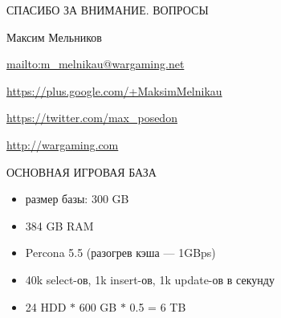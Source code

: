 \documentclass[aspectratio=169]{beamer}
\begin{document}
{


\begin{frame}{СПАСИБО ЗА ВНИМАНИЕ. ВОПРОСЫ}
    \begin{block}{Максим Мельников}
    \par \url{mailto:m\_melnikau@wargaming.net}
    \par \url{https://plus.google.com/+MaksimMelnikau}
    \par \url{https://twitter.com/max\_posedon}
    \par \url{http://wargaming.com}
    \end{block}
\end{frame}
}

\begin{frame}{ОСНОВНАЯ ИГРОВАЯ БАЗА}
    \begin{itemize}
        \item размер базы: 300 GB
        \item 384 GB RAM
        \item Percona 5.5 (разогрев кэша --- 1GBps)
        \item 40k select-ов, 1k insert-ов, 1k update-ов в секунду
        \item 24 HDD $*$ 600 GB $*$ 0.5 = 6 TB
    \end{itemize}
\end{frame}
\end{document}
